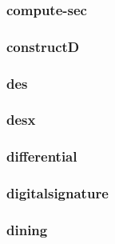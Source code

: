 \begin{frame} \frametitle{compute-sec}
\begin{figure}
\begin{center}

\end{center}
\end{figure}
\end{frame}
\begin{frame} \frametitle{constructD}
\begin{figure}
\begin{center}

\end{center}
\end{figure}
\end{frame}
\begin{frame} \frametitle{des}
\begin{figure}
\begin{center}

\end{center}
\end{figure}
\end{frame}
\begin{frame} \frametitle{desx}
\begin{figure}
\begin{center}

\end{center}
\end{figure}
\end{frame}
\begin{frame} \frametitle{differential}
\begin{figure}
\begin{center}

\end{center}
\end{figure}
\end{frame}
\begin{frame} \frametitle{digitalsignature}
\begin{figure}
\begin{center}

\end{center}
\end{figure}
\end{frame}
\begin{frame} \frametitle{dining}
\begin{figure}
\begin{center}

\end{center}
\end{figure}
\end{frame}
